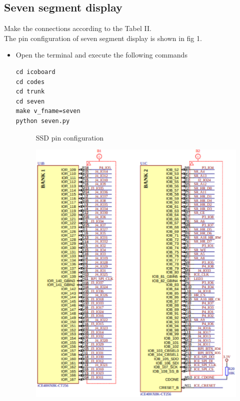 \documentclass[journal,12pt,twocolumn]{IEEEtran}
\begin{document}
\subsection{Seven segment display}
Make the connections according to the Tabel II.\\
The pin configuration of seven segment display is shown in fig 1.
\begin{table}[!h]
\centering

\caption{}
\label{table:components}
\end{table}
\begin{itemize}
\item Open the terminal and execute the following commands
\begin{lstlisting}
cd icoboard
cd codes
cd trunk
cd seven
make v_fname=seven
python seven.py
\end{lstlisting}
\begin{figure}[!h]
\centering

\caption{SSD pin configuration}
\label{fig:arduino}
\end{figure}
\begin{figure}[!h]
\centering
\includegraphics[scale=0.5]{./tabel/icoboard2.eps}

\end{figure}
\end{itemize}
\end{document}
